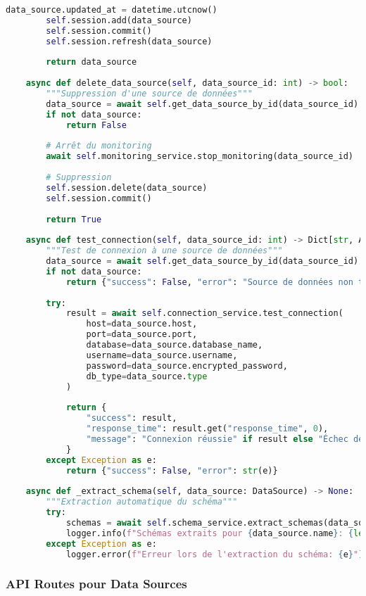 \begin{lstlisting}[language=Python, caption=Service DataSourceService - Résolution des Limitations Microsoft Purview]
        data_source.updated_at = datetime.utcnow()
        self.session.add(data_source)
        self.session.commit()
        self.session.refresh(data_source)
        
        return data_source
    
    async def delete_data_source(self, data_source_id: int) -> bool:
        """Suppression d'une source de données"""
        data_source = await self.get_data_source_by_id(data_source_id)
        if not data_source:
            return False
        
        # Arrêt du monitoring
        await self.monitoring_service.stop_monitoring(data_source_id)
        
        # Suppression
        self.session.delete(data_source)
        self.session.commit()
        
        return True
    
    async def test_connection(self, data_source_id: int) -> Dict[str, Any]:
        """Test de connexion à une source de données"""
        data_source = await self.get_data_source_by_id(data_source_id)
        if not data_source:
            return {"success": False, "error": "Source de données non trouvée"}
        
        try:
            result = await self.connection_service.test_connection(
                host=data_source.host,
                port=data_source.port,
                database=data_source.database_name,
                username=data_source.username,
                password=data_source.encrypted_password,
                db_type=data_source.type
            )
            
            return {
                "success": result,
                "response_time": result.get("response_time", 0),
                "message": "Connexion réussie" if result else "Échec de connexion"
            }
        except Exception as e:
            return {"success": False, "error": str(e)}
    
    async def _extract_schema(self, data_source: DataSource) -> None:
        """Extraction automatique du schéma"""
        try:
            schemas = await self.schema_service.extract_schemas(data_source)
            logger.info(f"Schémas extraits pour {data_source.name}: {len(schemas)} tables")
        except Exception as e:
            logger.error(f"Erreur lors de l'extraction du schéma: {e}")
\end{lstlisting}

\subsubsection{API Routes pour Data Sources}

